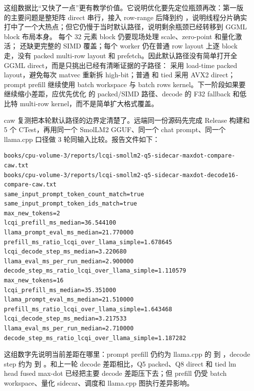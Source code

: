 这组数据比“又快了一点”更有教学价值。它说明优化要先定位瓶颈再改：第一版  的主要问题是整矩阵 direct 串行，接入 row-range 后降到约 ，说明线程分片确实打中了一个大热点；但它仍慢于当时默认路径，说明剩余瓶颈已经转移到 GGML block 布局本身。 每个 32 元素 block 仍要现场处理 scale、zero-point 和量化激活； 还缺更完整的 SIMD 覆盖；每个 worker 仍在普通 row layout 上逐 block 走，没有 packed multi-row layout 和 prefetch。因此默认路径没有简单打开全 GGML direct，而是只挑出已经有清晰证据的子路径： 采用 load-time packed layout，避免每次 matvec 重新拆 high-bit；普通  和 tied  采用 AVX2  direct；prompt prefill 继续使用 batch workspace 与 batch rows kernel。下一阶段如果要继续缩小差距，应优先优化  的 packed/SIMD 路径、decode 的 F32 fallback 和低比特 multi-row kernel，而不是简单扩大格式覆盖。

caw 复测把本轮默认路径的边界定清楚了。远端同一份源码先完成 Release 构建和 5 个 CTest，再用同一个 SmolLM2 GGUF、同一个  chat prompt、同一个 llama.cpp  口径做 3 轮同输入比较。报告文件如下：

\begin{lstlisting}[numbers=none,caption={Q5 sidecar、Q8 lm head max-dot 与 Q6 negative 的 caw 报告}]
books/cpu-volume-3/reports/lcqi-smollm2-q5-sidecar-maxdot-compare-caw.txt
books/cpu-volume-3/reports/lcqi-smollm2-q5-sidecar-maxdot-decode16-compare-caw.txt
same_input_prompt_token_count_match=true
same_input_prompt_token_ids_match=true
max_new_tokens=2
lcqi_prefill_ms_median=36.544100
llama_prompt_eval_ms_median=21.770000
prefill_ms_ratio_lcqi_over_llama_simple=1.678645
lcqi_decode_step_ms_median=3.220680
llama_eval_ms_per_run_median=2.900000
decode_step_ms_ratio_lcqi_over_llama_simple=1.110579
max_new_tokens=16
lcqi_prefill_ms_median=35.351000
llama_prompt_eval_ms_median=21.510000
prefill_ms_ratio_lcqi_over_llama_simple=1.643468
lcqi_decode_step_ms_median=3.217533
llama_eval_ms_per_run_median=2.710000
decode_step_ms_ratio_lcqi_over_llama_simple=1.187282
\end{lstlisting}

这组数字先说明当前差距在哪里：prompt prefill 仍约为 llama.cpp 的  到 ，decode step 约为  到 。和上一轮  decode 差距相比，Q5 packed、Q8 direct 和 tied lm head fused max-dot 已经把主要 decode 差距压下去；但 prefill 仍受 batch workspace、量化 sidecar、调度和 llama.cpp 图执行差异影响。

